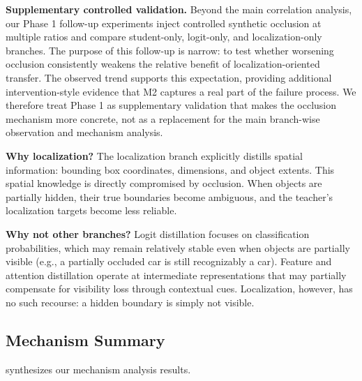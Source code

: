 \textbf{Supplementary controlled validation.} Beyond the main correlation analysis, our Phase 1 follow-up experiments inject controlled synthetic occlusion at multiple ratios and compare student-only, logit-only, and localization-only branches. The purpose of this follow-up is narrow: to test whether worsening occlusion consistently weakens the relative benefit of localization-oriented transfer. The observed trend supports this expectation, providing additional intervention-style evidence that M2 captures a real part of the failure process. We therefore treat Phase 1 as supplementary validation that makes the occlusion mechanism more concrete, not as a replacement for the main branch-wise observation and mechanism analysis.

\textbf{Why localization?} The localization branch explicitly distills spatial information: bounding box coordinates, dimensions, and object extents. This spatial knowledge is directly compromised by occlusion. When objects are partially hidden, their true boundaries become ambiguous, and the teacher's localization targets become less reliable.

\textbf{Why not other branches?} Logit distillation focuses on classification probabilities, which may remain relatively stable even when objects are partially visible (e.g., a partially occluded car is still recognizably a car). Feature and attention distillation operate at intermediate representations that may partially compensate for visibility loss through contextual cues. Localization, however, has no such recourse: a hidden boundary is simply not visible.

\subsection{Mechanism Summary}

 synthesizes our mechanism analysis results.

